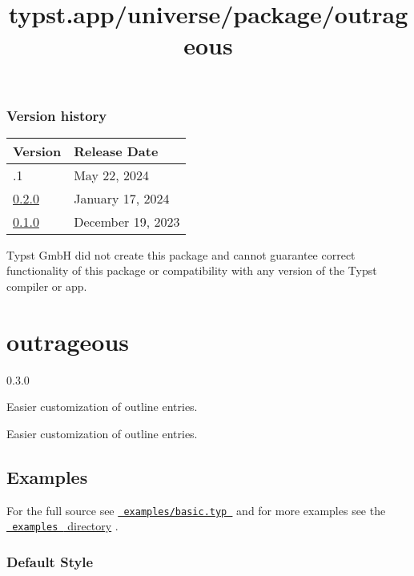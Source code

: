 \label{versions}
\subsubsection{Version history}\label{version-history}

\begin{longtable}[]{@{}ll@{}}
\toprule\noalign{}
Version & Release Date \\
\midrule\noalign{}
\endhead
\bottomrule\noalign{}
\endlastfoot
0.2.1 & May 22, 2024 \\
\href{https://typst.app/universe/package/riesketcher/0.2.0/}{0.2.0} &
January 17, 2024 \\
\href{https://typst.app/universe/package/riesketcher/0.1.0/}{0.1.0} &
December 19, 2023 \\
\end{longtable}

Typst GmbH did not create this package and cannot guarantee correct
functionality of this package or compatibility with any version of the
Typst compiler or app.


\title{typst.app/universe/package/outrageous}

\label{banner}
\section{outrageous}\label{outrageous}

{ 0.3.0 }

Easier customization of outline entries.

\label{readme}
Easier customization of outline entries.

\subsection{Examples}\label{examples}

For the full source see
\href{https://github.com/typst/packages/raw/main/packages/preview/outrageous/0.3.0/examples/basic.typ}{\texttt{\ examples/basic.typ\ }}
and for more examples see the
\href{https://github.com/typst/packages/raw/main/packages/preview/outrageous/0.3.0/examples}{\texttt{\ examples\ }
directory} .

\subsubsection{Default Style}\label{default-style}


